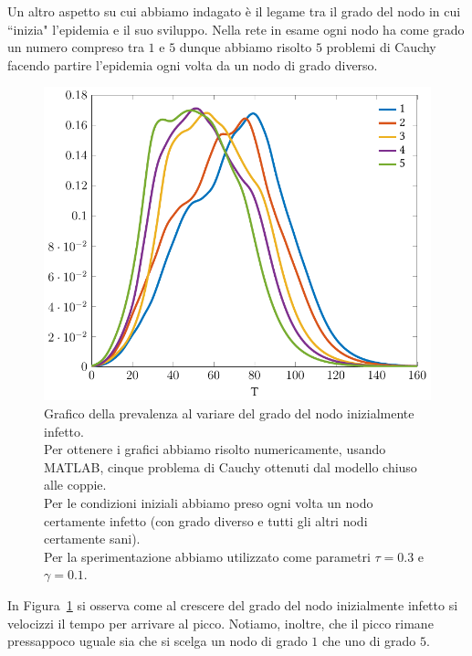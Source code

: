 Un altro aspetto su cui abbiamo indagato \`e il legame tra il grado del nodo in cui ``inizia" l'epidemia e il suo sviluppo.
Nella rete in esame ogni nodo ha come grado un numero compreso tra $1$ e $5$ dunque abbiamo risolto $5$ problemi di Cauchy facendo partire l'epidemia ogni volta da un nodo di grado diverso. 
\begin{figure}[htbp]
\centering
%
\includegraphics{Figure/minnesota_prevalenza}
\caption[Grafico della prevalenza al variare del grado del nodo inizialmente infetto.]{Grafico della prevalenza al variare del grado del nodo inizialmente infetto.\\ Per ottenere i grafici abbiamo risolto numericamente, usando MATLAB, cinque problema di Cauchy ottenuti dal modello chiuso alle coppie.\\
Per le condizioni iniziali abbiamo preso ogni volta un nodo certamente infetto (con grado diverso e tutti gli altri nodi certamente sani).\\
Per la sperimentazione abbiamo utilizzato come parametri $\tau=0.3$ e $\gamma=0.1$.}
\label{fig::minnesota_prevalenza}
\end{figure}
In Figura~\ref{fig::minnesota_prevalenza} si osserva come al crescere del grado del nodo inizialmente infetto si velocizzi il tempo per arrivare al picco. Notiamo, inoltre, che il picco rimane pressappoco uguale sia che si scelga un nodo di grado $1$ che uno di grado $5$.

